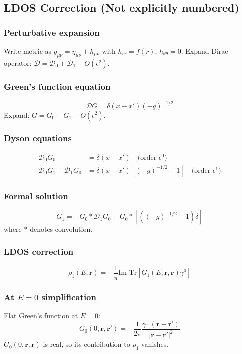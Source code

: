 \documentclass[12pt]{article}
\begin{document}
\subsection{LDOS Correction (Not explicitly numbered)}

\subsubsection{Perturbative expansion}
Write metric as $g_{\mu\nu} = \eta_{\mu\nu} + h_{\mu\nu}$ with $h_{rr} = f(r)$, $h_{\theta\theta} = 0$.
Expand Dirac operator: $\mathcal{D} = \mathcal{D}_0 + \mathcal{D}_1 + O(\epsilon^2)$.

\subsubsection{Green's function equation}
\begin{equation}
    \mathcal{D} G = \delta(x-x')(-g)^{-1/2}
\end{equation}
Expand: $G = G_0 + G_1 + O(\epsilon^2)$.

\subsubsection{Dyson equations}
\begin{align}
    \mathcal{D}_0 G_0 &= \delta(x-x') \quad \text{(order $\epsilon^0$)} \\
    \mathcal{D}_0 G_1 + \mathcal{D}_1 G_0 &= \delta(x-x')[(-g)^{-1/2} - 1] \quad \text{(order $\epsilon^1$)}
\end{align}

\subsubsection{Formal solution}
\begin{equation}
    G_1 = -G_0 * \mathcal{D}_1 G_0 - G_0 * [((-g)^{-1/2} - 1)\delta]
\end{equation}
where $*$ denotes convolution.

\subsubsection{LDOS correction}
\begin{equation}
    \rho_1(E, \mathbf{r}) = -\frac{1}{\pi} \text{Im Tr}[G_1(E, \mathbf{r}, \mathbf{r})\gamma^0]
\end{equation}

\subsubsection{At $E=0$ simplification}
Flat Green's function at $E=0$:
\begin{equation}
    G_0(0, \mathbf{r}, \mathbf{r}') = -\frac{1}{2\pi} \frac{\gamma \cdot (\mathbf{r}-\mathbf{r}')}{|\mathbf{r}-\mathbf{r}'|^2}
\end{equation}
$G_0(0, \mathbf{r}, \mathbf{r})$ is real, so its contribution to $\rho_1$ vanishes.
\end{document}
